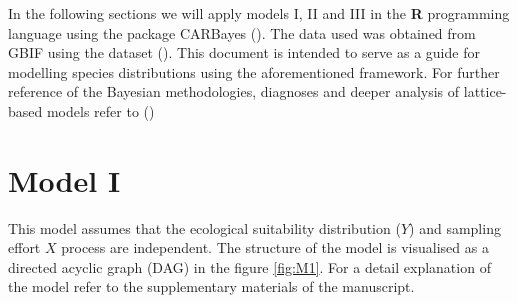 \documentclass[11pt]{article}
\begin{document}
In the following sections we will apply models I, II and III in the \textbf{R} programming language using the package CARBayes (\cite{Lee2013}). The data used was obtained from GBIF using the dataset (\cite{gbifmexdata}). This document is intended to serve as a guide for modelling species distributions using the aforementioned framework. For further reference of the Bayesian methodologies, diagnoses and deeper analysis of lattice-based models refer to (\cite{Lee2013,Rue2005})

\section{Model I}
\label{sec:org0a3b132}

This model assumes that the ecological suitability distribution (\(Y\)) and sampling effort \(X\) process are independent. The structure of the model is visualised as a directed acyclic graph (DAG) in the figure \ref{fig:M1}.  For a detail explanation of the model refer to the supplementary materials of the manuscript.
\end{document}

